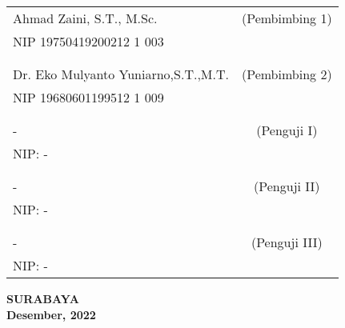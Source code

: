     \noindent
    \begin{tabularx}{\textwidth}{X c}
      Ahmad Zaini, S.T., M.Sc.          & (Pembimbing 1) \\
      NIP 19750419200212 1 003        & \\
      &  \\
      &  \\
      Dr. Eko Mulyanto Yuniarno,S.T.,M.T.& (Pembimbing 2) \\
      NIP 19680601199512 1 009        & \\
      &  \\
      &  \\
      -  & (Penguji I) \\
      NIP: -       & \\
      &  \\
      &  \\
      - & (Penguji II) \\
      NIP: -        & \\
      &  \\
      &  \\
      -           & (Penguji III) \\
      NIP: -       & \\
    \end{tabularx}
  \endgroup

  \vspace{4ex}

  \begin{center}
    \textbf{SURABAYA} \\
    \textbf{Desember, 2022}
  \end{center}
\endgroup

